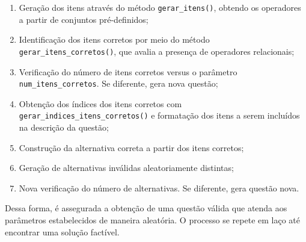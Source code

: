 \begin{enumerate}
    \item Geração dos itens através do método \verb|gerar_itens()|, obtendo os operadores a partir de conjuntos pré-definidos;
    \item Identificação dos itens corretos por meio do método \verb|gerar_itens_corretos()|, que avalia a presença de operadores relacionais;
    \item Verificação do número de itens corretos versus o parâmetro \verb|num_itens_corretos|. Se diferente, gera nova questão;
    \item Obtenção dos índices dos itens corretos com \verb|gerar_indices_itens_corretos()| e formatação dos itens a serem incluídos na descrição da questão;
    \item Construção da alternativa correta a partir dos itens corretos;
    \item Geração de alternativas inválidas aleatoriamente distintas;
    \item Nova verificação do número de alternativas. Se diferente, gera questão nova.
\end{enumerate}

Dessa forma, é assegurada a obtenção de uma questão válida que atenda aos parâmetros estabelecidos de maneira aleatória. O processo se repete em laço até encontrar uma solução factível.

